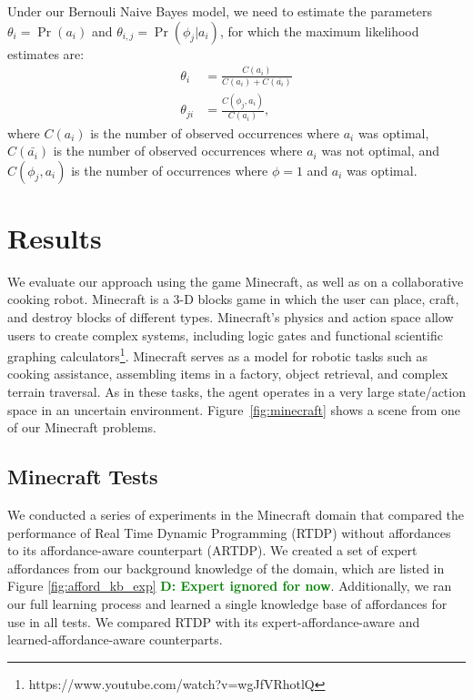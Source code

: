 \documentclass[conference]{IEEEtran}
\newcommand{\dnote}[1]{\textcolor{Green}{\textbf{D: #1}}}
\begin{document}
Under our Bernouli Naive Bayes model, we need to estimate the parameters $\theta_i = \Pr(a_i)$ and $\theta_{i,j} = \Pr(\phi_j | a_i)$, for which the maximum likelihood estimates are:
\begin{align}
\theta_i &= \frac{C(a_i)}{C(a_i) + C(\bar{a_i})} \\
\theta_{ji} &= \frac{C(\phi_j, a_i)}{C(a_i)},
\end{align}
where $C(a_i)$ is the number of observed occurrences where $a_i$ was optimal,
$C(\bar{a_i})$ is the number of observed occurrences where $a_i$ was not optimal,
and $C(\phi_j, a_i)$ is the number of occurrences where $\phi=1$ and $a_i$ was optimal.

\section{Results}
\label{sec:results}

We evaluate our approach using the game Minecraft, as well as on a
collaborative cooking robot.  Minecraft is a 3-D blocks game in which
the user can place, craft, and destroy blocks of different types.
Minecraft's physics and action space allow users to create complex
systems, including logic gates and functional scientific graphing
calculators\footnote{https://www.youtube.com/watch?v=wgJfVRhotlQ}.
Minecraft serves as a model for robotic tasks such as cooking
assistance, assembling items in a factory, object retrieval, and
complex terrain traversal.  As in these tasks, the agent operates in a
very large state/action space in an uncertain environment.
Figure~\ref{fig:minecraft} shows a scene from one of our Minecraft
problems.

\subsection{Minecraft Tests}
We conducted a series of experiments in the Minecraft domain that
compared the performance of Real Time Dynamic Programming (RTDP)
without affordances to its affordance-aware counterpart (ARTDP). We created a set of expert
affordances from our background knowledge of the domain, which are
listed in Figure \ref{fig:afford_kb_exp} \dnote{Expert ignored for now}. Additionally, we ran our full
learning process and learned a single knowledge base of affordances for use in all tests. We compared
RTDP with its expert-affordance-aware and learned-affordance-aware 
counterparts. 
\end{document}
